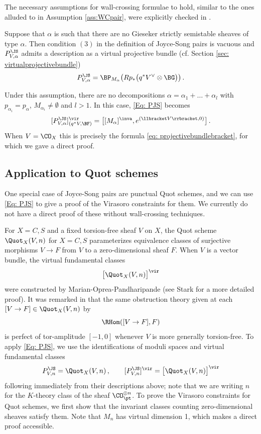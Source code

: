 The necessary assumptions for wall-crossing formulae to hold, similar to the ones alluded to in Assumption \ref{ass:WCpair}, were explicitly checked in \cite[Appendix]{Bo21.5}.

\begin{remark}
\notready\label{rem: JSprojectivebundle}
    Suppose that $\alpha$ is such that there are no Gieseker strictly semistable sheaves of type $\alpha$. Then condition $(3)$ in the definition of Joyce-Song pairs is vacuous and $P^{\JS}_{V,\alpha}$ admits a description as a virtual projective bundle (cf. Section \ref{sec: virtualprojectivebundle})
    \[P^{\JS}_{V,\alpha}=\BP_{M_\alpha}\big(Rp_\ast\big(q^\ast V^\vee\otimes \BG\big)\big)\,.\]

   Under this assumption, there are no decompositions $\alpha=\alpha_1+\ldots+\alpha_l$ with $p_{\alpha_i}=p_{\alpha}$, $M_{\alpha_i}\neq \emptyset$ and $l>1$. In this case, \eqref{Eq: PJS} becomes
    \[[P^{\JS}_{V,\alpha}]^\vir_{(q^*V,\BF)}=\big[[M_\alpha]^\inva, e^{(\llbracket V\rrbracket,0)}\big]\,.\]
When $V=\CO_X$ this is precisely the formula \eqref{eq: projectivebundlebracket}, for which we gave a direct proof.
\end{remark}


\subsection{Application to Quot schemes}

One special case of Joyce-Song pairs are punctual Quot schemes, and we can use \eqref{Eq: PJS} to give a proof of the Virasoro constraints for them. We currently do not have a direct proof of these without wall-crossing techniques.

For $X=C,S$ and a fixed torsion-free sheaf $V$ on $X$, the Quot scheme $\Quot_X(V,n)$ for $X=C,S$ parameterizes equivalence classes of surjective morphisms $V\to F$ from $V$ to a zero-dimensional sheaf $F$. When $V$ is a vector bundle, the virtual fundamental classes
$$
\big[\Quot_X(V,n)\big]^\vir
$$
were constructed by Marian-Oprea-Pandharipande \cite[Lemma 1.1]{MOP1} (see Stark \cite[Proposition 5]{stark2} for a more detailed proof). It was remarked in \cite[Section 1.1]{Bo21.5} that the same obstruction theory given at each $[V\to F]\in \Quot_X(V,n)$ by
$$
\RHom([V\to F], F)
$$
is perfect of tor-amplitude $[-1,0]$ whenever $V$ is more generally torsion-free. To apply \eqref{Eq: PJS}, we use the identifications of moduli spaces and virtual fundamental classes
$$
P^{\JS}_{V,n} = \Quot_X(V,n)\,,\qquad [P^{\JS}_{V,n}]^\vir = \big[\Quot_X(V,n)\big]^\vir
$$
following immediately from their descriptions above; note that we are writing $n$ for the $K$-theory class of the sheaf $\CO_{\pt}^{\oplus n}$.
To prove the Virasoro constraints for Quot schemes, we first show that the invariant classes counting zero-dimensional sheaves satisfy them. Note that $M_n$ has virtual dimension 1, which makes a direct proof accessible.

